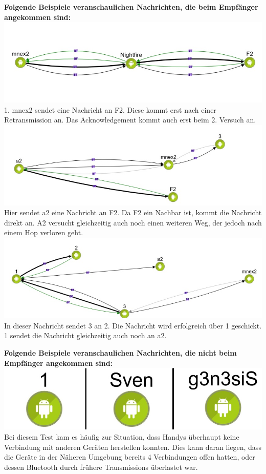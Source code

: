 \textbf{Folgende Beispiele veranschaulichen Nachrichten, die beim
Empfänger angekommen sind:}
\includegraphics[width=1.0\textwidth]{belege/grosstests/Bilder/Grosstest2/Test1Erfolg2.jpg}
1. mnex2 sendet eine Nachricht an F2. Diese kommt erst nach einer
Retransmission an. Das Acknowledgement kommt auch erst beim 2. Versuch
an.
\includegraphics[width=1.0\textwidth]{belege/grosstests/Bilder/Grosstest2/Test1Erfolg1.jpg}
Hier sendet a2 eine Nachricht an F2. Da F2 ein Nachbar ist, kommt die
Nachricht direkt an. A2 versucht gleichzeitig auch noch einen weiteren
Weg, der jedoch nach einem Hop verloren geht.
\includegraphics[width=1.0\textwidth]{belege/grosstests/Bilder/Grosstest2/Test1Erfolg3.jpg}
In dieser Nachricht sendet 3 an 2. Die Nachricht wird erfolgreich über 1
geschickt. 1 sendet die Nachricht gleichzeitig auch noch an a2.

\textbf{Folgende Beispiele veranschaulichen Nachrichten, die nicht beim
Empfänger angekommen sind:}
\includegraphics[width=1.0\textwidth]{belege/grosstests/Bilder/Grosstest2/Test1Misserfolg2.jpg}
Bei diesem Test kam es häufig zur Situation, dass Handys überhaupt keine
Verbindung mit anderen Geräten herstellen konnten. Dies kann daran
liegen, dass die Geräte in der Näheren Umgebung bereits 4 Verbindungen
offen hatten, oder dessen Bluetooth durch frühere Transmissions
überlastet war.

